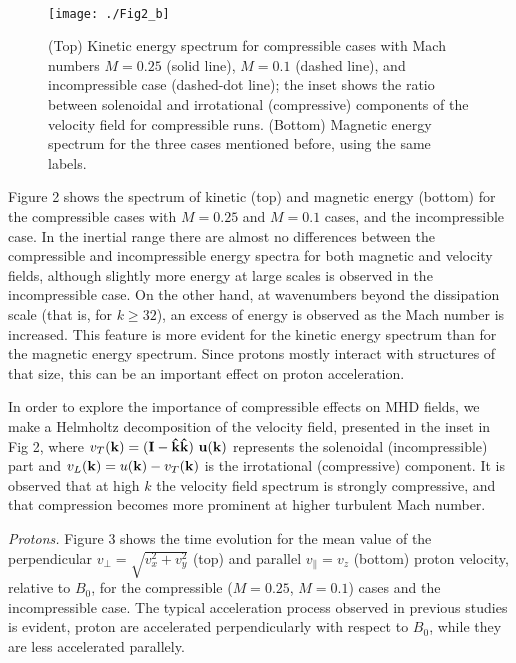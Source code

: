 \documentclass[%
aip,pop,amsmath,amssymb,
 reprint,%
]{revtex4-1}
\begin{document}
\begin{figure}[<h!>]
\begin{center}
\\
{\texttt{[image: ./Fig2\_b]}}\\
\caption{(Top) Kinetic energy spectrum for compressible cases with Mach 
numbers $M=0.25$ (solid line), $M=0.1$ (dashed line), and incompressible case 
(dashed-dot line); the inset shows the ratio between solenoidal
and irrotational (compressive) 
components of the velocity field for compressible runs. (Bottom) Magnetic energy spectrum
for the three cases mentioned before, using the same labels.}
\end{center}
\label{mean square velocity}
\end{figure}

Figure 2 shows the spectrum of kinetic (top) and magnetic energy (bottom) for the 
compressible cases with $M=0.25$ and $M=0.1$ cases, and the
incompressible case. In the inertial range there are almost no differences between the 
compressible and incompressible energy spectra for 
both magnetic and velocity fields, although slightly more energy at 
large scales is observed in the incompressible case. On the other hand, at wavenumbers beyond
the dissipation scale (that is, for $k\geq32$),  an excess of energy is observed as the Mach
number is increased. This feature is more evident for the kinetic energy spectrum
than for the magnetic energy spectrum. Since protons mostly interact with structures
of that size, this can be an important effect on proton acceleration.



In order to explore the importance of compressible effects on MHD fields,
we make a Helmholtz decomposition of the velocity field, presented
in the inset in Fig 2, where $v_T({\bf k}) = (\bf I - \hat k\hat k) \ u({\bf k})$ 
represents the solenoidal (incompressible) part 
and $v_L({\bf k}) = u({\bf k}) - v_T({\bf k})$ is
the irrotational (compressive)
component. It is observed that at high $k$ the velocity field
spectrum is strongly compressive,
and that compression becomes more prominent at higher 
turbulent Mach number.

{\it Protons.}
Figure 3 shows the time evolution for the mean value of
the perpendicular $v_\perp = \sqrt{v_x^2+v_y^2}$ 
(top) and parallel $v_\parallel=v_z$ (bottom) proton velocity, 
relative to $B_0$, 
for the compressible ($M=0.25$, $M=0.1$) cases
and the incompressible case. 
The typical acceleration process observed in previous studies is
evident, proton are accelerated perpendicularly with respect to $B_0$, 
while they are less accelerated parallely. 
\end{document}
